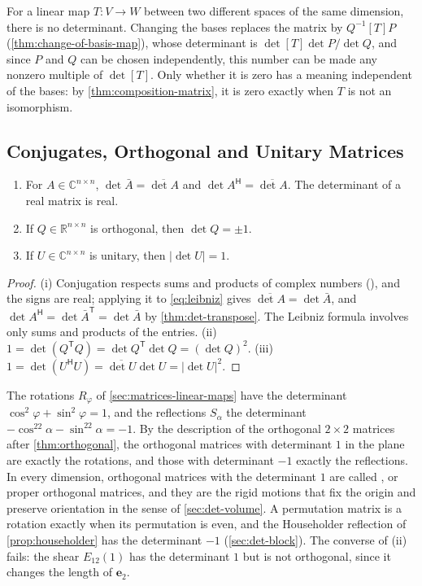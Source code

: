 For a linear map $T\colon V\to W$ between two different spaces of the same dimension, there is no determinant. Changing the bases replaces the matrix by $Q^{-1}[T]P$ (\cref{thm:change-of-basis-map}), whose determinant is $\det[T]\det P/\det Q$, and since $P$ and $Q$ can be chosen independently, this number can be made any nonzero multiple of $\det[T]$. Only whether it is zero has a meaning independent of the bases: by \cref{thm:composition-matrix}, it is zero exactly when $T$ is not an isomorphism.

\subsection{Conjugates, Orthogonal and Unitary Matrices}

\begin{proposition}
\label{prop:det-unitary}
\leavevmode
\begin{enumerate}
\item For $A\in\mathbb C^{n\times n}$, $\det\bar A=\overline{\det A}$ and $\det A^{\mathsf H}=\overline{\det A}$. The determinant of a real matrix is real.
\item If $Q\in\mathbb R^{n\times n}$ is orthogonal, then $\det Q=\pm1$.
\item If $U\in\mathbb C^{n\times n}$ is unitary, then $|\det U|=1$.
\end{enumerate}
\end{proposition}

\begin{proof}
(i) Conjugation respects sums and products of complex numbers (), and the signs are real; applying it to \eqref{eq:leibniz} gives $\overline{\det A}=\det\bar A$, and $\det A^{\mathsf H}=\det\bar A^{\mathsf T}=\det\bar A$ by \cref{thm:det-transpose}. The Leibniz formula involves only sums and products of the entries. (ii) $1=\det(Q^{\mathsf T}Q)=\det Q^{\mathsf T}\det Q=(\det Q)^2$. (iii) $1=\det(U^{\mathsf H}U)=\overline{\det U}\det U=|\det U|^2$.
\end{proof}

The rotations $R_\varphi$ of \cref{sec:matrices-linear-maps} have the determinant $\cos^2\varphi+\sin^2\varphi=1$, and the reflections $S_\alpha$ the determinant $-\cos^22\alpha-\sin^22\alpha=-1$. By the description of the orthogonal $2\times2$ matrices after \cref{thm:orthogonal}, the orthogonal matrices with determinant $1$ in the plane are exactly the rotations, and those with determinant $-1$ exactly the reflections. In every dimension, orthogonal matrices with the determinant $1$ are called , or proper orthogonal matrices, and they are the rigid motions that fix the origin and preserve orientation in the sense of \cref{sec:det-volume}. A permutation matrix is a rotation exactly when its permutation is even, and the Householder reflection of \cref{prop:householder} has the determinant $-1$ (\cref{sec:det-block}). The converse of (ii) fails: the shear $E_{12}(1)$ has the determinant $1$ but is not orthogonal, since it changes the length of $\mathbf e_2$.

